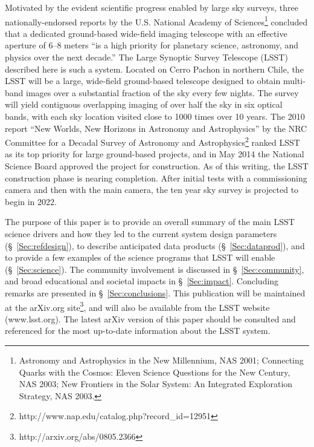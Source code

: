 Motivated by the evident scientific progress enabled by large sky surveys,
three nationally-endorsed reports by the U.S. National Academy of Sciences\footnote{
  Astronomy and Astrophysics in the New Millennium, NAS 2001;
  Connecting Quarks with the Cosmos: Eleven Science Questions for the New Century, NAS 2003;
  New Frontiers in the Solar System: An Integrated Exploration Strategy, NAS 2003.
}
concluded that a dedicated ground-based wide-field imaging telescope with an effective aperture
of 6--8 meters ``is a high priority for planetary science, astronomy, and physics
over the next decade.'' The Large Synoptic Survey Telescope (LSST) described here is
such a system. Located on Cerro Pachon in northern Chile,
the LSST will be a large, wide-field ground-based telescope
designed to obtain multi-band images over a substantial fraction of the sky
every few nights. The survey will yield contiguous overlapping imaging of over
half the sky in six optical bands, with each sky location visited close to 1000 times over
10 years. The 2010 report ``New Worlds, New Horizons in Astronomy and Astrophysics''
by the NRC Committee for a Decadal Survey of Astronomy and
Astrophysics\footnote{http://www.nap.edu/catalog.php?record\_id=12951}
ranked LSST as its top priority for large ground-based projects, and in May 2014 the National
Science Board approved the project for construction.
As of this writing, the LSST construction phase is nearing completion.
After initial tests with a commissioning camera and then with the main camera, the
ten year sky survey is projected to begin in 2022.

The purpose of this paper is to provide an overall summary of the main LSST
science drivers and how they led to the current system design parameters
(\S~\ref{Sec:refdesign}), to describe anticipated data products (\S~\ref{Sec:dataprod}),
and to provide a few examples of the science programs that LSST will enable
(\S~\ref{Sec:science}). The community involvement is discussed in \S~\ref{Sec:community},
and broad educational and societal impacts in \S~\ref{Sec:impact}. Concluding
remarks are presented in \S~\ref{Sec:conclusions}. This publication will be maintained
at the arXiv.org site\footnote{http://arxiv.org/abs/0805.2366}, and will also
be available from the LSST website (www.lsst.org). The latest arXiv version of this paper
should be consulted and referenced for the most up-to-date information about the
LSST system.

